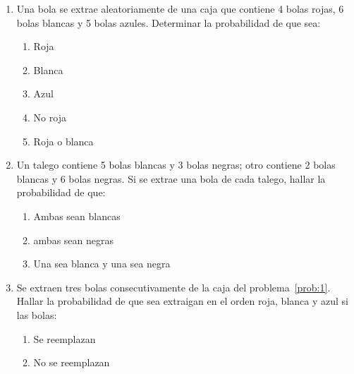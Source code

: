 \documentclass[fleqn]{article}
\begin{document}
 
\begin{enumerate}
	\item \label{prob:1} Una bola se extrae aleatoriamente de una caja que contiene 4 bolas rojas, 6 bolas blancas y 5 bolas azules. Determinar la probabilidad de que sea:
	\begin{enumerate}
	\item Roja \noanswer
	\item Blanca \noanswer
	\item Azul\noanswer
	\item No roja \noanswer
	\item Roja o blanca\noanswer
	\end{enumerate}
	\newpage
   \item Un talego contiene 5 bolas blancas y 3 bolas negras; otro contiene 2 bolas blancas y 6 bolas negras. Si se extrae una bola de cada talego, hallar la probabilidad de que:
      \begin{enumerate}
	 \item Ambas sean blancas\noanswer
	 \item ambas sean negras \noanswer
	 \item Una sea blanca y una sea negra\noanswer
      \end{enumerate}
   \item Se extraen tres bolas consecutivamente de la caja del problema~\ref{prob:1}. Hallar la probabilidad de que sea extraigan en el orden roja, blanca y azul si las bolas:
   \begin{enumerate}
   \item Se reemplazan\noanswer
   \item No se reemplazan\noanswer
   \end{enumerate}
   \end{enumerate}
\end{document}
